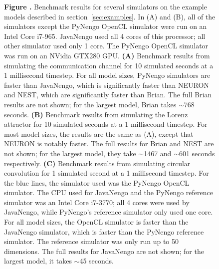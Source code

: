 \documentclass{frontiersSCNS}
\begin{document}
\begin{figure}
 \textbf{
   \label{fig:benchmarks}
   Figure .}{
   Benchmark results for several simulators
   on the example models described
   in section~\ref{sec:examples}.
   In (A) and (B), all of the simulators
   except the PyNengo OpenCL simulator
   were run on an Intel Core i7-965.
   JavaNengo used all 4 cores of this processor;
   all other simulator used only 1 core.
   The PyNengo OpenCL simulator
   was run on an NVidia GTX280 GPU.
   \textbf{(A)} Benchmark results from simulating
   the communication channel for 10 simulated seconds
   at a 1 millisecond timestep.
   For all model sizes, PyNengo simulators
   are faster than JavaNengo,
   which is significantly faster than NEURON and NEST,
   which are significantly faster than Brian.
   The full Brian results are not shown;
   for the largest model, Brian takes $\sim$768 seconds.
   \textbf{(B)} Benchmark results from simulating
   the Lorenz attractor for 10 simulated seconds
   at a 1 millisecond timestep.
   For most model sizes,
   the results are the same as (A),
   except that NEURON is notably faster.
   The full results for Brian and NEST are not shown;
   for the largest model, they take $\sim$1467
   and $\sim$601 seconds respectively.
   \textbf{(C)} Benchmark results from simulating
   circular convolution for 1 simulated second
   at a 1 millisecond timestep.
   For the blue lines, the simulator used
   was the PyNengo OpenCL simulator.
   The CPU used for JavaNengo and
   the PyNengo reference simulator
   was an Intel Core i7-3770;
   all 4 cores were used by JavaNengo,
   while PyNengo's reference simulator
   only used one core.
   For all model sizes,
   the OpenCL simulator is faster
   than the JavaNengo simulator,
   which is faster than the PyNengo
   reference simulator.
   The reference simulator was only run
   up to 50 dimensions.
   The full results for JavaNengo
   are not shown; for the largest model,
   it takes $\sim$45 seconds.
 }
\end{figure}
\end{document}
